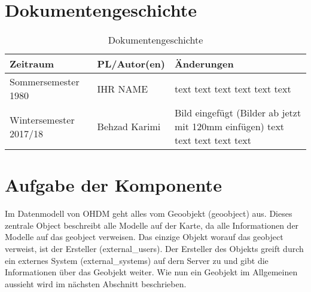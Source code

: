 \section{Dokumentengeschichte}
\begin{table}[h]
 \begin{tabular}{|l|l|p{4cm}|}
 \hline
 Zeitraum & PL/Autor(en) & Änderungen \\
 \hline
 Sommersemester 1980 & IHR NAME & 
text \newline 
text \newline 
text \newline 
text \newline 
text \newline 
text \newline 
 
  \\
 \hline
 Wintersemester 2017/18 & Behzad Karimi & 
Bild eingefügt (Bilder ab jetzt mit 120mm einfügen) \newline 
text \newline 
text \newline 
text \newline 
text \newline 
text \newline 
 
  \\
 \hline
 \end{tabular}
 \caption{Dokumentengeschichte}
 \end{table}

\section{Aufgabe der Komponente}



Im Datenmodell von OHDM geht alles vom Geoobjekt (geoobject) aus. Dieses zentrale Object beschreibt alle Modelle auf der Karte, da alle Informationen der Modelle auf das geobject verweisen. Das einzige Objekt worauf das geobject verweist, ist der Ersteller (external\_users). Der Ersteller des Objekts greift durch ein externes System (external\_systems) auf dern Server zu und gibt die Informationen über das Geobjekt weiter. Wie nun ein Geobjekt im Allgemeinen aussieht wird im nächsten Abschnitt beschrieben.

